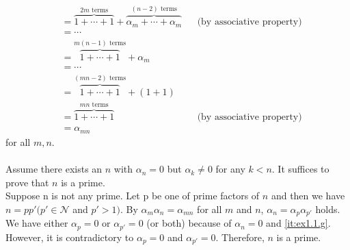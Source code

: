\documentclass{article}
\theoremstyle{thmstyleone}
\theoremstyle{thmstyletwo}
\theoremstyle{thmstylethree}
\newcommand\N{\mathcal N}
\begin{document}
\begin{align*}
  &= \overbrace{1 + \dotsb + 1}^\text{$2m$ terms} + \overbrace{\alpha_m + \dotsb + \alpha_m}^\text{$(n-2)$ terms} && \text{(by associative property)} \\
  &= \dotsb \\
  &= \overbrace{1 + \dotsb + 1}^\text{$m(n-1)$ terms} + \alpha_m \\
  &= \dotsb \\
  &= \overbrace{1 + \dotsb + 1}^\text{$(mn-2)$ terms} + (1 + 1) \\ 
  &= \overbrace{1 + \dotsb + 1}^\text{$mn$ terms} && \text{(by associative property)}\\
  &= \alpha_{mn}
\end{align*} for all $m, n$.\\\\
Assume there exists an $n$ with $\alpha_n = 0$ but $\alpha_k \ne 0$ for any $k < n$.
It suffices to prove that $n$ is a prime.\\
Suppose n is not any prime. Let p be one of prime factors of $n$ and then we have $n = p p' (p' \in\N$ and $p' > 1)$.
By $\alpha_m \alpha_n = \alpha_{mn}$ for all $m$ and $n$, $\alpha_n = \alpha_p \alpha_{p'}$ holds.
We have either $\alpha_p = 0$ or $\alpha_{p'} = 0$ (or both) because of $\alpha_n = 0$ and  \ref{it:ex1.1.g}.
However, it is contradictory to $\alpha_p = 0$ and $\alpha_{p'} = 0$. Therefore, $n$ is a prime.
\end{document}
